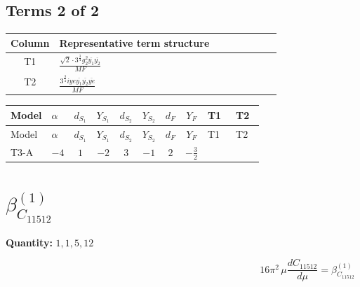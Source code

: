 \documentclass[8pt]{article}
\begin{document}
\begin{landscape}
\subsection*{Terms 2 of 2}
\begin{center}
\begin{tabular}{@{}c >{\raggedright\arraybackslash}p{0.82\linewidth}@{}}
\toprule
Column & Representative term structure \\
\midrule
T1 & \(\displaystyle \frac{\sqrt{2} \cdot 3^{\frac{3}{4}} g_{2}^{2} \overline{y_{1}} \overline{y_{2}}}{MF}\) \\
\midrule
T2 & \(\displaystyle \frac{3^{\frac{3}{4}} i ye \overline{y_{1}} \overline{y_{2}} \overline{ye}}{MF}\) \\
\midrule
\bottomrule
\end{tabular}
\end{center}
\smallskip
\tiny
\begin{longtable}{@{}llcccccc >{\raggedright\arraybackslash}p{0.21\linewidth} >{\raggedright\arraybackslash}p{0.21\linewidth}@{}}
\toprule
Model & $\alpha$ & $d_{S_1}$ & $Y_{S_1}$ & $d_{S_2}$ & $Y_{S_2}$ & $d_F$ & $Y_F$ & T1 & T2 \\
\midrule
\endfirsthead
\toprule
Model & $\alpha$ & $d_{S_1}$ & $Y_{S_1}$ & $d_{S_2}$ & $Y_{S_2}$ & $d_F$ & $Y_F$ & T1 & T2 \\
\midrule
\endhead
T3-A & $-4$ & $1$ & $-2$ & $3$ & $-1$ & $2$ & $-\frac{3}{2}$ & \scriptsize\adjustbox{max width=\linewidth}{$\begin{gathered} \frac{\sqrt{2} \cdot 3^{\frac{3}{4}} g_{2}^{2} \overline{y_{1}} \overline{y_{2}}}{3 MF}\end{gathered}$} & \scriptsize\adjustbox{max width=\linewidth}{$\begin{gathered} \frac{3^{\frac{3}{4}} i ye \overline{y_{1}} \overline{y_{2}} \overline{ye}}{12 MF}\end{gathered}$} \\
\midrule
\bottomrule
\end{longtable}
\clearpage
\section*{$\beta_{C_{11512}}^{(1)}$}
\noindent\textbf{Quantity: }$\mathrm{1,1,5,12}$\par\smallskip
\[16\pi^2\,\mu\frac{d C_{11512}}{d\mu}=\beta_{C_{11512}}^{(1)}\]

\end{landscape}
\end{document}

